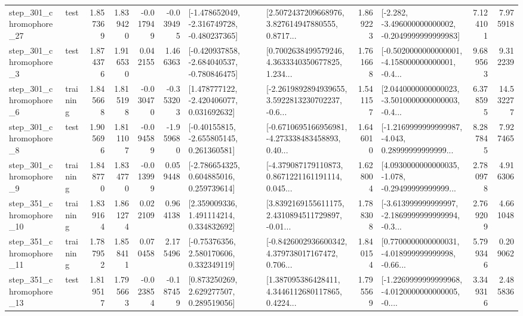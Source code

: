 \begin{tabular}{llrrrrllrlrr}
  step\_301\_chromophore\_27 &      test &      1.857369 &    1.839420 &     -0.017949 & -0.039495 &  [-1.478652049, -2.316749728, -0.480237365] &  [2.5072437209668976, 3.827614947880555, 0.8717... &       1.869223 &  [-2.282, -3.496000000000002, -0.2049999999999983] &            7.124101 &          7.975918 \\
   step\_301\_chromophore\_3 &      test &      1.874376 &    1.916530 &      0.042155 &  1.466363 &  [-0.420937858, -2.684040537, -0.780846475] &  [0.7002638499579246, 4.3633340350677825, 1.234... &       1.761668 &  [-0.5020000000000001, -4.158000000000001, -0.4... &            9.689563 &          9.312239 \\
   step\_301\_chromophore\_6 &  training &      1.845668 &    1.815198 &     -0.030470 & -0.353203 &    [1.478777122, -2.420406077, 0.031692632] &  [-2.2619892894939655, 3.5922813230702237, -0.6... &       1.541157 &  [2.0440000000000023, -3.5010000000000003, -0.4... &            6.378595 &         14.532277 \\
   step\_301\_chromophore\_8 &      test &      1.905696 &    1.811107 &     -0.094589 & -1.959680 &    [-0.40155815, -2.655805145, 0.261360581] &  [-0.6710695166956981, -4.273338483458893, 0.40... &       1.646010 &  [-1.2169999999999987, -4.043, 0.28999999999999... &            8.287845 &          7.927465 \\
   step\_301\_chromophore\_9 &  training &      1.848770 &    1.834770 &     -0.013999 &  0.059448 &    [-2.786654325, 0.604885016, 0.259739614] &  [-4.379087179110873, 0.8671221161191114, 0.045... &       1.628004 &  [4.0930000000000035, -1.078, -0.29499999999999... &            2.780978 &          4.916306 \\
  step\_351\_chromophore\_10 &  training &      1.839164 &    1.861274 &      0.022109 &  0.964138 &     [2.359009336, 1.491114214, 0.334832692] &  [3.8392169155611175, 2.4310894511729897, -0.01... &       1.788308 &  [-3.613999999999997, -2.1869999999999994, -0.3... &            2.769209 &          4.661048 \\
  step\_351\_chromophore\_11 &  training &      1.787952 &    1.858411 &      0.070458 &  2.175496 &     [-0.75376356, 2.580170606, 0.332349119] &  [-0.8426002936600342, 4.379738017167472, 0.706... &       1.840154 &  [0.7700000000000031, -4.018999999999998, -0.66... &            5.799346 &          0.209062 \\
  step\_351\_chromophore\_13 &      test &      1.819517 &    1.795663 &     -0.023854 & -0.187459 &     [0.873250269, 2.629277507, 0.289519056] &  [1.387095386428411, 4.3446112680117865, 0.4224... &       1.795569 &  [-1.2269999999999968, -4.0120000000000005, -0.... &            3.349316 &          2.485836 \\

\end{tabular}
